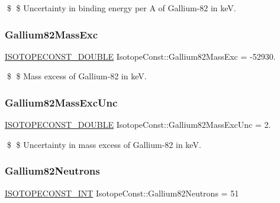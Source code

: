 \$ \$ Uncertainty in binding energy per A of Gallium-\/82 in keV. \mbox{\label{group___isotope_const-_gallium-_ga82_ga653a7b2b2922291633cbbfc9036fc405}} 
\subsubsection{\texorpdfstring{Gallium82\+Mass\+Exc}{Gallium82MassExc}}
{\footnotesize\ttfamily \mbox{\hyperlink{group___isotope_const-_macros_ga8f45a7272ce02c0b4c65c44636ed719a}{I\+S\+O\+T\+O\+P\+E\+C\+O\+N\+S\+T\+\_\+\+D\+O\+U\+B\+LE}} Isotope\+Const\+::\+Gallium82\+Mass\+Exc = -\/52930.}

\$ \$ Mass excess of Gallium-\/82 in keV. \mbox{\label{group___isotope_const-_gallium-_ga82_ga72fb775009f284ce902a6303eb444278}} 
\subsubsection{\texorpdfstring{Gallium82\+Mass\+Exc\+Unc}{Gallium82MassExcUnc}}
{\footnotesize\ttfamily \mbox{\hyperlink{group___isotope_const-_macros_ga8f45a7272ce02c0b4c65c44636ed719a}{I\+S\+O\+T\+O\+P\+E\+C\+O\+N\+S\+T\+\_\+\+D\+O\+U\+B\+LE}} Isotope\+Const\+::\+Gallium82\+Mass\+Exc\+Unc = 2.}

\$ \$ Uncertainty in mass excess of Gallium-\/82 in keV. \mbox{\label{group___isotope_const-_gallium-_ga82_ga7764e522b261f6c85810ae48a3ffac6b}} 
\subsubsection{\texorpdfstring{Gallium82\+Neutrons}{Gallium82Neutrons}}
{\footnotesize\ttfamily \mbox{\hyperlink{group___isotope_const-_macros_ga5f18360b3e99483a35c32d789e62621c}{I\+S\+O\+T\+O\+P\+E\+C\+O\+N\+S\+T\+\_\+\+I\+NT}} Isotope\+Const\+::\+Gallium82\+Neutrons = 51}

